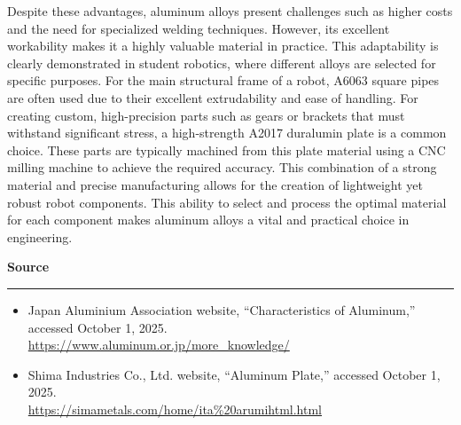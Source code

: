 \documentclass[11pt, dvipdfmx]{jsarticle}
\begin{document}
Despite these advantages, aluminum alloys present challenges such as higher costs and the need for specialized welding techniques. However, its excellent workability makes it a highly valuable material in practice. This adaptability is clearly demonstrated in student robotics, where different alloys are selected for specific purposes. For the main structural frame of a robot, A6063 square pipes are often used due to their excellent extrudability and ease of handling. For creating custom, high-precision parts such as gears or brackets that must withstand significant stress, a high-strength A2017 duralumin plate is a common choice. These parts are typically machined from this plate material using a CNC milling machine to achieve the required accuracy. This combination of a strong material and precise manufacturing allows for the creation of lightweight yet robust robot components. This ability to select and process the optimal material for each component makes aluminum alloys a vital and practical choice in engineering.

\vspace{1cm} %

\noindent\large{\textbf{Source}}
\hrule
\vspace{0.3cm}
\begin{itemize}
    \item Japan Aluminium Association website, ``Characteristics of Aluminum,'' accessed October 1, 2025.\\
    \url{https://www.aluminum.or.jp/more_knowledge/}
    \item Shima Industries Co., Ltd. website, ``Aluminum Plate,'' accessed October 1, 2025. \\\url{https://simametals.com/home/ita%20arumihtml.html}
\end{itemize}
\end{document}
